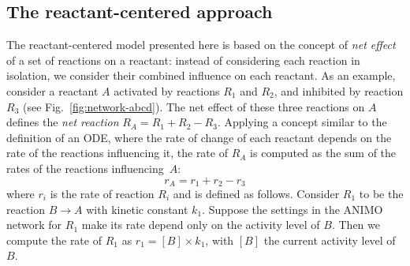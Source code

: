 \documentclass{llncs}
\begin{document}
\subsection{The reactant-centered approach}\label{sec:reactant-centered}
The reactant-centered model presented here is based on the concept of \emph{net effect} of a set of reactions on a reactant:
instead of considering each reaction in isolation, we consider their combined influence on each reactant.
As an example, consider a reactant $A$ activated by reactions $R_1$ and $R_2$, and inhibited
by reaction $R_3$ (see Fig.~\ref{fig:network-abcd}).
The net effect of these three reactions on $A$ defines the \emph{net reaction} $R_A = R_1 + R_2 - R_3.$
Applying a concept similar to the definition of an ODE,
where the rate of change of each reactant depends on the rate of the reactions influencing it,
the rate of $R_A$ is computed as the sum of the rates of the reactions influencing~$A$: 
$$r_A = r_1 + r_2 - r_3$$
where $r_i$ is the rate of reaction $R_i$ and is defined as follows.
Consider $R_1$ to be the reaction $B \rightarrow A$ with kinetic constant $k_1$.
Suppose the settings in the ANIMO network for $R_1$ make its rate depend only on the
activity level of $B$. Then we compute the rate of $R_1$ as $r_1 = [B] \times k_1$, with
$[B]$ the current activity level of~$B$.
\end{document}
